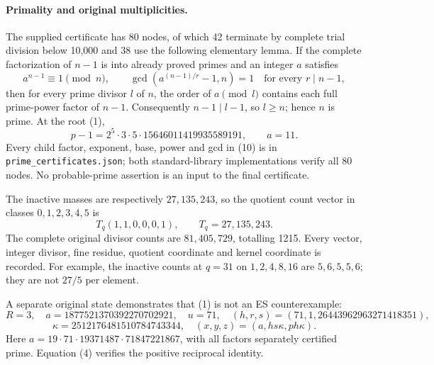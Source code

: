 \paragraph{Primality and original multiplicities.}
The supplied certificate has 80 nodes, of which 42 terminate by complete trial
division below 10,000 and 38 use the following elementary lemma. If the complete
factorization of $n-1$ is into already proved primes and an integer $a$ satisfies
\[
 a^{n-1}\equiv1\pmod n,\qquad
 \gcd(a^{(n-1)/r}-1,n)=1\quad\text{for every }r\mid n-1,
                                                               \tag{10}
\]
then for every prime divisor $l$ of $n$, the order of $a\pmod l$ contains each
full prime-power factor of $n-1$. Consequently $n-1\mid l-1$, so $l\ge n$;
hence $n$ is prime. At the root (1),
\[
 p-1=2^5\cdot3\cdot5\cdot15646011419935589191,
 \qquad a=11.
\]
Every child factor, exponent, base, power and gcd in (10) is in
\texttt{prime\_certificates.json}; both standard-library implementations verify
all 80 nodes. No probable-prime assertion is an input to the final certificate.

The inactive masses are respectively $27,135,243$, so the quotient count vector
in classes $0,1,2,3,4,5$ is
\[
 T_q(1,1,0,0,0,1),\qquad T_q=27,135,243.                 \tag{11}
\]
The complete original divisor counts are $81,405,729$, totalling 1215. Every
vector, integer divisor, fine residue, quotient coordinate and kernel coordinate
is recorded. For example, the inactive counts at $q=31$ on
$1,2,4,8,16$ are $5,6,5,5,6$; they are not $27/5$ per element.

A separate original state demonstrates that (1) is not an ES counterexample:
\[
 R=3,\quad a=1877521370392270702921,
 \quad u=71,\quad (h,r,s)=(71,1,26443962963271418351),
\]
\[
 \kappa=2512176481510784743344,
 \quad (x,y,z)=(a,hs\kappa,ph\kappa).                   \tag{12}
\]
Here $a=19\cdot71\cdot19371487\cdot71847221867$, with all factors separately
certified prime. Equation (4) verifies the positive reciprocal identity.

